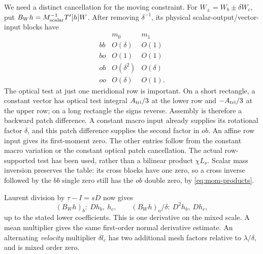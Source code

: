 \documentclass[11pt,a4paper]{article}
\numberwithin{equation}{section}
\theoremstyle{remark}
\begin{document}
We need a distinct cancellation for the moving constraint.
For \(W_\pm=W_b\pm\delta W_c\), put
\(B_W h=M_{\rm scalar}^{-1}T'[h]W\). After removing
\(\delta^{-1}\), its physical scalar-output/vector-input blocks have
\begin{equation}\label{eq:connection-moments}
 \begin{array}{c|cc}
       &m_0&m_1\\ \hline
 bb&O(\delta)&O(1)\\
 bo&O(1)&O(1)\\
 ob&O(\delta^2)&O(\delta)\\
 oo&O(\delta)&O(1).
 \end{array}
\end{equation}
The optical test at just one meridional row is important. On a short
rectangle, a constant vector has optical test integral \(A_{\rm tri}/3\)
at the lower row and \(-A_{\rm tri}/3\) at the upper row; on a long
rectangle the signs reverse. Assembly is therefore a backward patch
difference. A constant macro input already supplies its rotational
factor \(\delta\), and this patch difference supplies the second
factor in \(ob\). An affine row input gives its first-moment zero.
The other entries follow from the constant macro variation or the
constant optical patch cancellation. The actual row-supported test
has been used, rather than a bilinear product \(\chi L_\nu\).
Scalar mass inversion preserves the table: its cross blocks have one
zero, so a cross inverse followed by the \(bb\) single zero still
has the \(ob\) double zero, by \eqref{eq:mom-products}.

Laurent division by \(\tau-I=sD\) now gives
\[
 (B_W h)_b:\ Dh_b,\ h_c,\qquad
 (B_W h)_o/\delta:\ D^2h_b,\ Dh_c ,
\]
up to the stated lower coefficients. This is one derivative on the
mixed scale. A mean multiplier gives the same first-order normal
derivative estimate. An alternating \emph{velocity} multiplier
\(\delta l_c\) has two additional mesh factors relative to
\(\lambda/\delta\), and is mixed order zero.
\end{document}

